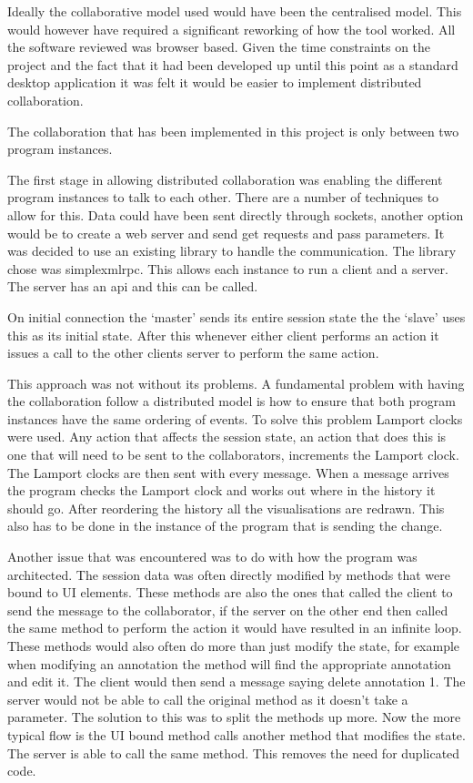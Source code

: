 Ideally the collaborative model used would have been the centralised model.  This would however have required a significant reworking of how the tool worked.  All the software reviewed was browser based.  Given the time constraints on the project and the fact that it had been developed up until this point as a standard desktop application it was felt it would be easier to implement distributed collaboration.

The collaboration that has been implemented in this project is only between two program instances.

The first stage in allowing distributed collaboration was enabling the different program instances to talk to each other. There are a number of techniques to allow for this.  Data could have been sent directly through sockets, another option would be to create a web server and send get requests and pass parameters.  It was decided to use an existing library to handle the communication.  The library chose was simplexmlrpc.  This allows each instance to run a client and a server.  The server has an api and this can be called.

On initial connection the `master' sends its entire session state the the `slave' uses this as its initial state.  After this whenever either client performs an action it issues a call to the other clients server to perform the same action.

This approach was not without its problems.  A fundamental problem with having the collaboration follow a distributed model is how to ensure that both program instances have the same ordering of events.  To solve this problem Lamport clocks were used.  Any action that affects the session state, an action that does this is one that will need to be sent to the collaborators, increments the Lamport clock.  The Lamport clocks are then sent with every message.  When a message arrives the program checks the Lamport clock and works out where in the history it should go.  After reordering the history all the visualisations are redrawn.  This also has to be done in the instance of the program that is sending the change.

Another issue that was encountered was to do with how the program was architected.  The session data was often directly modified by methods that were bound to \ac{UI} elements.  These methods are also the ones that called the client to send the message to the collaborator, if the server on the other end then called the same method to perform the action it would have resulted in an infinite loop.  These methods would also often do more than just modify the state, for example when modifying an annotation the method will find the appropriate annotation and edit it.  The client would then send a message saying delete annotation 1.  The server would not be able to call the original method as it doesn't take a parameter.  The solution to this was to split the methods up more.  Now the more typical flow is the \ac{UI} bound method calls another method that modifies the state.  The server is able to call the same method.  This removes the need for duplicated code.

